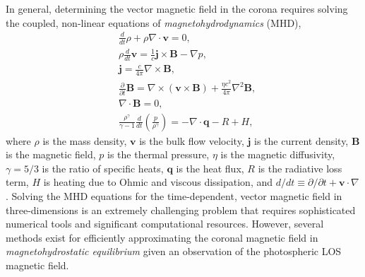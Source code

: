 
In general, determining the vector magnetic field in the corona requires solving the coupled, non-linear equations of \textit{magnetohydrodynamics} (MHD),
\begin{align}
    &\frac{d}{dt}\rho + \rho\nabla\cdot\mathbf{v} = 0, \label{eq:mhd_continuity} \\
    &\rho\frac{d}{dt}\mathbf{v} = \frac{1}{c}\mathbf{j}\times\mathbf{B} - \nabla p, \label{eq:mhd_momentum} \\
    &\mathbf{j} = \frac{c}{4\pi}\nabla\times\mathbf{B}, \label{eq:mhd_ampere} \\
    &\frac{\partial}{\partial t}\mathbf{B} = \nabla\times(\mathbf{v}\times\mathbf{B}) + \frac{\eta c^2}{4\pi}\nabla^2\mathbf{B}, \label{eq:mhd_faraday} \\
    &\nabla\cdot\mathbf{B} = 0, \label{eq:mhd_divb} \\
    &\frac{\rho^\gamma}{\gamma - 1}\frac{d}{dt}\left(\frac{p}{\rho^{\gamma}}\right) = -\nabla\cdot\mathbf{q} - R + H, \label{eq:mhd_energy}
\end{align}
where $\rho$ is the mass density, $\mathbf{v}$ is the bulk flow velocity, $\mathbf{j}$ is the current density, $\mathbf{B}$ is the magnetic field, $p$ is the thermal pressure, $\eta$ is the magnetic diffusivity, $\gamma=5/3$ is the ratio of specific heats, $\mathbf{q}$ is the heat flux, $R$ is the radiative loss term, $H$ is heating due to Ohmic and viscous dissipation, and $d/dt\equiv\partial/\partial t + \mathbf{v}\cdot\nabla$ \citep{priest_magnetohydrodynamics_2014}. Solving the MHD equations for the time-dependent, vector magnetic field in three-dimensions is an extremely challenging problem that requires sophisticated numerical tools and significant computational resources. However, several methods exist for efficiently approximating the coronal magnetic field in \textit{magnetohydrostatic equilibrium} given an observation of the photospheric LOS magnetic field.

